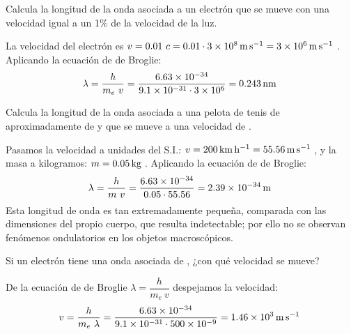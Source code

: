 \begin{exercise}
    Calcula la longitud de la onda asociada a un electrón que se mueve con una velocidad igual a un 1\% de la velocidad de la luz.
    \begin{solu}
        La velocidad del electrón es \(v = 0.01\ c = 0.01\cdot \SI{3e8}{\meter\per\second} = \velocidad[ms]{3e6}\).
        Aplicando la ecuación de de Broglie:
        \begin{equation*}
            \lambda = \dfrac{h}{m_e\ v} = \dfrac{\num{6.63e-34}}{\num{9.1e-31}\cdot \num{3e6}} = \distancia[nm]{0.243}
        \end{equation*}
    \end{solu}
\end{exercise}

\begin{exercise}
    Calcula la longitud de la onda asociada a una pelota de tenis de aproximadamente de  y que se mueve a una velocidad de .
    \begin{solu}
        Pasamos la velocidad a unidades del S.I.: \(v = \SI{200}{\kilo\meter\per\hour} = \velocidad[ms]{55.56}\), y la masa a kilogramos: \(m = \masa[kg]{0.05}\).
        Aplicando la ecuación de de Broglie:
        \begin{equation*}
            \lambda = \dfrac{h}{m\ v} = \dfrac{\num{6.63e-34}}{\num{0.05}\cdot \num{55.56}} = \distancia[m]{2.39e-34}
        \end{equation*}
        Esta longitud de onda es tan extremadamente pequeña, comparada con las dimensiones del propio cuerpo, que resulta indetectable; por ello no se observan fenómenos ondulatorios en los objetos macroscópicos.
    \end{solu}
\end{exercise}

\begin{exercise}
    Si un electrón tiene una onda asociada de , ¿con qué velocidad se mueve?
    \begin{solu}
        De la ecuación de de Broglie \(\lambda = \dfrac{h}{m_e\ v}\) despejamos la velocidad:
        \begin{equation*}
            v = \dfrac{h}{m_e\ \lambda} = \dfrac{\num{6.63e-34}}{\num{9.1e-31}\cdot \num{500e-9}} = \velocidad[ms]{1.46e3}
        \end{equation*}
    \end{solu}
\end{exercise}

